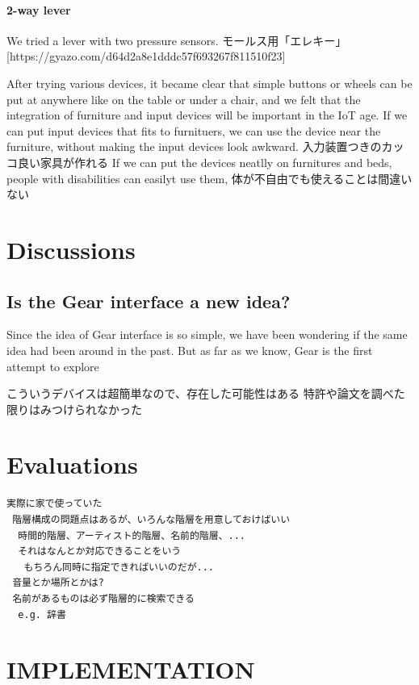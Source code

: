\documentclass{article}
\begin{document}
\paragraph{2-way lever}

We tried a lever with two pressure sensors.
  モールス用「エレキー」
  [https://gyazo.com/d64d2a8e1dddc57f693267f811510f23]

 After trying various devices, it became clear that simple buttons or wheels can be put at anywhere like on the table or under a chair, and we felt that the integration of furniture and input devices will be important in the IoT age.
 If we can put input devices that fits to furnituers, we can use the device near the furniture, without making the input devices look awkward.
  入力装置つきのカッコ良い家具が作れる
 If we can put the devices neatlly on furnitures and beds, people with disabilities can easilyt use them, 
 体が不自由でも使えることは間違いない

\section{Discussions}
\subsection{Is the Gear interface a new idea?}
  Since the idea of Gear interface is so simple, we have been wondering if the same idea had been around in the past.
  But as far as we know, Gear is the first attempt to explore 

 こういうデバイスは超簡単なので、存在した可能性はある
 特許や論文を調べた限りはみつけられなかった

\section{Evaluations}

\begin{verbatim}
実際に家で使っていた
 階層構成の問題点はあるが、いろんな階層を用意しておけばいい
  時間的階層、アーティスト的階層、名前的階層、...
  それはなんとか対応できることをいう
   もちろん同時に指定できればいいのだが...
 音量とか場所とかは?
 名前があるものは必ず階層的に検索できる
  e.g. 辞書
\end{verbatim}

\section*{IMPLEMENTATION}
\end{document}
